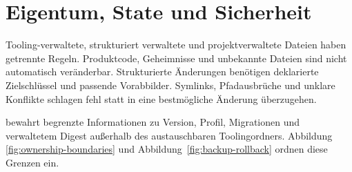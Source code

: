\section{Eigentum, State und Sicherheit}
\label{chap:ownership-state-security}

Tooling-verwaltete, strukturiert verwaltete und projektverwaltete Dateien haben getrennte
Regeln. Produktcode, Geheimnisse und unbekannte Dateien sind nicht automatisch
veränderbar. Strukturierte Änderungen benötigen deklarierte Zielschlüssel und passende
Vorabbilder. Symlinks, Pfadausbrüche und unklare Konflikte schlagen fehl statt in eine
bestmögliche Änderung überzugehen.

\ToolingState{} bewahrt begrenzte Informationen zu Version, Profil, Migrationen und
verwaltetem Digest außerhalb des austauschbaren Toolingordners. Abbildung
\ref{fig:ownership-boundaries} und Abbildung~\ref{fig:backup-rollback} ordnen diese
Grenzen ein.
